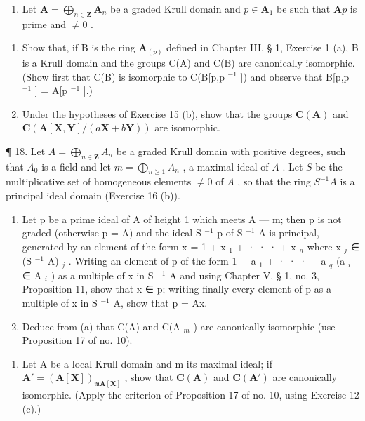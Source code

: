 \begin{enumerate}
\def\labelenumi{\arabic{enumi}.}
\setcounter{enumi}{16}
\tightlist
\item
  Let \(\mathbf{A} = \bigoplus_{n\in \mathbf{Z}}\mathbf{A}_n\) be a graded Krull domain and \(p\in \mathbf{A}_1\) be such that \(\mathbf{A}p\) is prime and \(\neq 0\) .
\end{enumerate}

\begin{enumerate}
\def\labelenumi{(\alph{enumi})}
\item
  Show that, if B is the ring \(\mathbf{A}_{(p)}\) defined in Chapter III, § 1, Exercise 1 (a), B is a Krull domain and the groups C(A) and C(B) are canonically isomorphic. (Show first that C(B) is isomorphic to C(B{[}p,p \(^{-1}\) {]}) and observe that B{[}p,p \(^{-1}\) {]} = A{[}p \(^{-1}\) {]}.)
\item
  Under the hypotheses of Exercise 15 (b), show that the groups \(\mathbf{C}(\mathbf{A})\) and \(\mathbf{C}(\mathbf{A}[\mathbf{X},\mathbf{Y}] / (a\mathbf{X} + b\mathbf{Y}))\) are isomorphic.
\end{enumerate}

¶ 18. Let \(A = \bigoplus_{n \in \mathbf{Z}} A_n\) be a graded Krull domain with positive degrees, such that \(A_0\) is a field and let \(m = \bigoplus_{n \geqslant 1} A_n\) , a maximal ideal of \(A\) . Let \(S\) be the multiplicative set of homogeneous elements \(\neq 0\) of \(A\) , so that the ring \(S^{-1}A\) is a principal ideal domain (Exercise 16 (b)).

\begin{enumerate}
\def\labelenumi{(\alph{enumi})}
\item
  Let p be a prime ideal of A of height 1 which meets A --- m; then p is not graded (otherwise p = A) and the ideal S \(^{-1}\) p of S \(^{-1}\) A is principal, generated by an element of the form x = 1 + x \(_{1}\) + · · · + x \(_{n}\) where x \(_{j}\) ∈ (S \(^{-1}\) A) \(_{j}\) . Writing an element of p of the form 1 + a \(_{1}\) + · · · + a \(_{q}\) (a \(_{i}\) ∈ A \(_{i}\) ) as a multiple of x in S \(^{-1}\) A and using Chapter V, § 1, no. 3, Proposition 11, show that x ∈ p; writing finally every element of p as a multiple of x in S \(^{-1}\) A, show that p = Ax.
\item
  Deduce from (a) that C(A) and C(A \(_{m}\) ) are canonically isomorphic (use Proposition 17 of no. 10).
\end{enumerate}

\begin{enumerate}
\def\labelenumi{\arabic{enumi}.}
\setcounter{enumi}{18}
\tightlist
\item
  Let A be a local Krull domain and m its maximal ideal; if \(\mathbf{A}' = (\mathbf{A}[\mathbf{X}])_{\mathfrak{m}\mathbf{A}[\mathbf{X}]}\) , show that \(\mathbf{C}(\mathbf{A})\) and \(\mathbf{C}(\mathbf{A}')\) are canonically isomorphic. (Apply the criterion of Proposition 17 of no. 10, using Exercise 12 (c).)
\end{enumerate}


